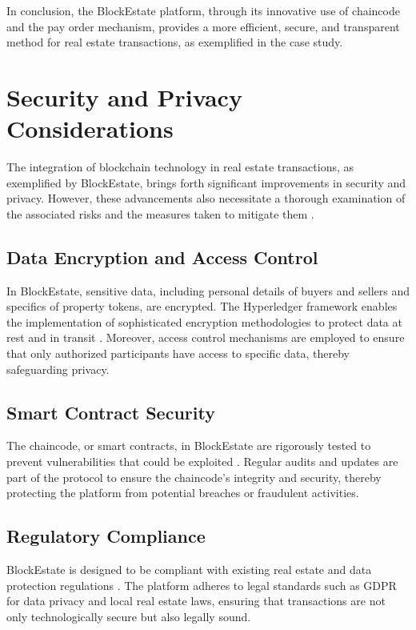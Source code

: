 \documentclass[3p,times]{elsarticle}
\begin{document}
In conclusion, the BlockEstate platform, through its innovative use of chaincode and the pay order mechanism, provides a more efficient, secure, and transparent method for real estate transactions, as exemplified in the case study.

\section{Security and Privacy Considerations}

The integration of blockchain technology in real estate transactions, as exemplified by BlockEstate, brings forth significant improvements in security and privacy. However, these advancements also necessitate a thorough examination of the associated risks and the measures taken to mitigate them \cite{kothari2020smart}.

\subsection{Data Encryption and Access Control}

In BlockEstate, sensitive data, including personal details of buyers and sellers and specifics of property tokens, are encrypted. The Hyperledger framework enables the implementation of sophisticated encryption methodologies to protect data at rest and in transit \cite{wu2023ebss}. Moreover, access control mechanisms are employed to ensure that only authorized participants have access to specific data, thereby safeguarding privacy.

\subsection{Smart Contract Security}

The chaincode, or smart contracts, in BlockEstate are rigorously tested to prevent vulnerabilities that could be exploited \cite{baum2021tokenization}. Regular audits and updates are part of the protocol to ensure the chaincode's integrity and security, thereby protecting the platform from potential breaches or fraudulent activities.

\subsection{Regulatory Compliance}

BlockEstate is designed to be compliant with existing real estate and data protection regulations \cite{moringiello2022blockchain}. The platform adheres to legal standards such as GDPR for data privacy and local real estate laws, ensuring that transactions are not only technologically secure but also legally sound.
\end{document}
